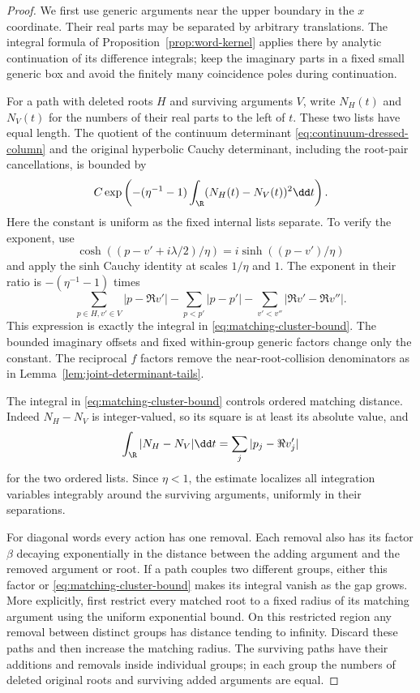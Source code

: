 \begin{proof}
We first use generic arguments near the upper boundary in the
$x$ coordinate.  Their real parts may be separated by arbitrary
translations.  The integral formula of
Proposition~\ref{prop:word-kernel} applies there by analytic
continuation of its difference integrals; keep the imaginary
parts in a fixed small generic box and avoid the finitely many
coincidence poles during continuation.

For a path with deleted roots $H$ and surviving arguments $V$,
write $N_H(t)$ and $N_V(t)$ for the numbers of their real parts
to the left of $t$.  These two lists have equal length.
The quotient of the continuum determinant
\eqref{eq:continuum-dressed-column} and the original hyperbolic
Cauchy determinant, including the root-pair cancellations, is
bounded by
\begin{equation}\label{eq:matching-cluster-bound}
 C\exp\left(-(\eta^{-1}-1)
                   \int_\R(N_H(t)-N_V(t))^2\dd t\right).
\end{equation}
Here the constant is uniform as the fixed internal lists separate.
To verify the exponent, use
\[
 \cosh((p-v'+i\lambda/2)/\eta)
       =i\sinh((p-v')/\eta)
\]
and apply the sinh Cauchy identity at scales $1/\eta$ and $1$.
The exponent in their ratio is $-(\eta^{-1}-1)$ times
\[
 \sum_{p\in H,v'\in V}|p-\Re v'|
       -\sum_{p<p'}|p-p'|
       -\sum_{v'<v''}|\Re v'-\Re v''|.
\]
This expression is exactly the integral in
\eqref{eq:matching-cluster-bound}.  The bounded imaginary offsets
and fixed within-group generic factors change only the constant.
The reciprocal $f$ factors remove the near-root-collision
denominators as in Lemma~\ref{lem:joint-determinant-tails}.

The integral in \eqref{eq:matching-cluster-bound} controls ordered
matching distance.  Indeed $N_H-N_V$ is integer-valued, so its
square is at least its absolute value, and
\[
 \int_\R|N_H-N_V|\dd t
     =\sum_j|p_j-\Re v'_j|
\]
for the two ordered lists.  Since $\eta<1$, the estimate
localizes all integration variables integrably around the
surviving arguments, uniformly in their separations.

For diagonal words every action has one removal.  Each removal
also has its factor $\beta$ decaying exponentially in the
distance between the adding argument and the removed argument
or root.  If a path couples two different groups, either this
factor or \eqref{eq:matching-cluster-bound} makes its integral
vanish as the gap grows.  More explicitly, first restrict every
matched root to a fixed radius of its matching argument using
the uniform exponential bound.  On this restricted region any
removal between distinct groups has distance tending to infinity.
Discard these paths and then increase the matching radius.
The surviving paths have their additions and removals inside
individual groups; in each group the numbers of deleted original
roots and surviving added arguments are equal.


\end{proof}
